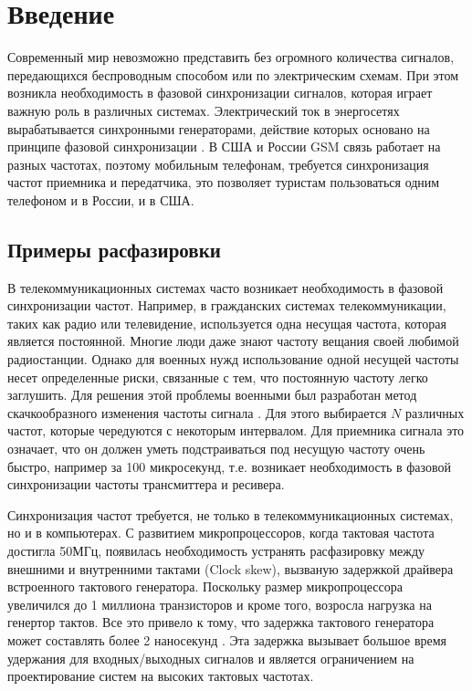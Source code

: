 \documentclass[a4paper,article,14pt]{extarticle}
\begin{document}




 
\tableofcontents



\pagebreak
\section{Введение}
Современный мир невозможно представить без огромного количества сигналов, передающихся беспроводным способом или по электрическим схемам. При этом возникла необходимость в фазовой синхронизации сигналов, которая играет важную роль в различных системах. Электрический ток в энергосетях вырабатывается синхронными генераторами, действие которых основано на принципе фазовой синхронизации \cite{ilie}. В США и России GSM связь работает на разных частотах, поэтому мобильным телефонам, требуется синхронизация частот приемника и передатчика, это позволяет туристам пользоваться одним телефоном и в России, и в США.

\subsection{Примеры расфазировки}
В телекоммуникационных системах часто возникает необходимость в фазовой синхронизации частот. Например, в гражданских системах телекоммуникации, таких как радио или телевидение, используется одна несущая частота, которая является постоянной. Многие люди даже знают частоту вещания своей любимой радиостанции. Однако для военных нужд использование одной несущей частоты несет определенные риски, связанные с тем, что постоянную частоту легко заглушить. Для решения этой проблемы военными был разработан метод скачкообразного изменения частоты сигнала \cite{ghulam}. Для этого выбирается $N$ различных частот, которые чередуются с некоторым интервалом. Для приемника сигнала это означает, что он должен уметь подстраиваться под несущую частоту очень быстро, например за 100 микросекунд, т.е. возникает необходимость в фазовой синхронизации частоты трансмиттера и ресивера. 

Синхронизация частот требуется, не только в телекоммуникационных системах, но и в компьютерах. С развитием микропроцессоров, когда тактовая частота достигла 50МГц, появилась необходимость устранять расфазировку между внешними и внутренними тактами (Clock skew), вызваную задержкой драйвера встроенного тактового генератора. Поскольку размер микропроцессора увеличился до 1 миллиона транзисторов и кроме того, возросла нагрузка на генертор тактов. Все это привело к тому, что задержка тактового генератора может составлять более 2 наносекунд \cite{Microprocessors}. Эта задержка вызывает большое время удержания для входных/выходных сигналов и является ограничением на проектирование систем на высоких тактовых частотах.
\end{document}
